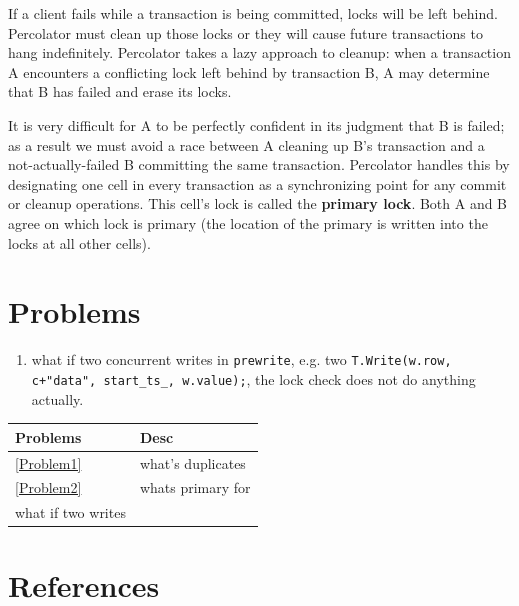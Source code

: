 \documentclass[11pt]{article}
\begin{document}
If a client fails while a transaction is being committed, locks will be left behind. Percolator must
clean up those locks or they will cause future transactions to hang indefinitely. Percolator takes a
lazy approach to cleanup: when a transaction A encounters a conflicting lock left behind by
transaction B, A may determine that B has failed and erase its locks.

It is very difficult for A to be perfectly confident in its judgment that B is failed; as a result we
must avoid a race between A cleaning up B’s transaction and a not-actually-failed B committing the same
transaction. Percolator handles this by designating one cell in every transaction as a synchronizing
point for any commit or cleanup operations. This cell’s lock is called the \textbf{primary lock}. Both A and B
agree on which lock is primary (the location of the primary is written into the locks at all other cells).
\section{Problems}
\label{sec:orga35f004}
\begin{enumerate}
\item what if two concurrent writes in \texttt{prewrite}, e.g. two \texttt{T.Write(w.row, c+"data", start\_ts\_, w.value);},
the lock check does not do anything actually.
\end{enumerate}
\begin{center}
\begin{tabular}{ll}
Problems & Desc\\
\hline
\ref{Problem1} & what's duplicates\\
\ref{Problem2} & whats primary for\\
what if two writes & \\
\end{tabular}
\end{center}
\section{References}
\label{sec:org7bfa680}
\label{bibliographystyle link}


\label{bibliography link}

\end{document}
